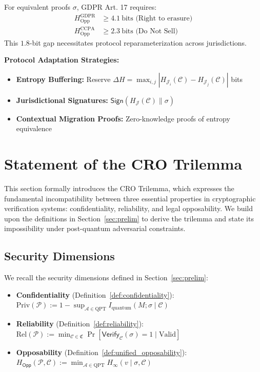 \documentclass[preprint,12pt]{elsarticle}
\begin{document}
            \begin{example}
                For equivalent proofs $\sigma$, GDPR Art. 17 requires:
                \begin{align*}
                    H_{\text{Opp}}^{\text{GDPR}} &\geq 4.1\ \text{bits (Right to erasure)} \\
                    H_{\text{Opp}}^{\text{CCPA}} &\geq 2.3\ \text{bits (Do Not Sell)}
                \end{align*}
                This $1.8$-bit gap necessitates protocol reparameterization across jurisdictions.
            \end{example}

            \textbf{Protocol Adaptation Strategies:}
            \begin{itemize}
                \item \textbf{Entropy Buffering:} Reserve $\Delta H = \max_{i,j} |H_{\mathcal{J}_i}(\mathcal{C}) - H_{\mathcal{J}_j}(\mathcal{C})|$ bits
                \item \textbf{Jurisdictional Signatures:} $\mathsf{Sign}(H_{\mathcal{J}}(\mathcal{C}) \parallel \sigma)$
                \item \textbf{Contextual Migration Proofs:} Zero-knowledge proofs of entropy equivalence
            \end{itemize}


    \section{Statement of the CRO Trilemma}\label{sec:cro_trilemma}

        This section formally introduces the CRO Trilemma, which expresses the fundamental incompatibility between three essential properties in cryptographic verification systems: confidentiality, reliability, and legal opposability. We build upon the definitions in Section~\ref{sec:prelim} to derive the trilemma and state its impossibility under post-quantum adversarial constraints.
        \subsection{Security Dimensions}
            We recall the security dimensions defined in Section~\ref{sec:prelim}:
            \begin{itemize}
                \item \textbf{Confidentiality} (Definition~\ref{def:confidentiality}): 
                    $\mathrm{Priv}(\mathcal{P}) := 1 - \sup_{\mathcal{A} \in \mathrm{QPT}} I_{\text{quantum}}(M; \sigma \mid \mathcal{C})$
                \item \textbf{Reliability} (Definition~\ref{def:reliability}): 
                    $\mathrm{Rel}(\mathcal{P}) := \min_{\mathcal{C} \in \mathfrak{C}} \Pr[\mathsf{Verify}_\mathcal{C}(\sigma) = 1 \mid \text{Valid}]$
                \item \textbf{Opposability} (Definition~\ref{def:unified_opposability}): 
                    $H_{\mathsf{Opp}}(\mathcal{P}, \mathcal{C}) := \min_{\mathcal{A} \in \mathrm{QPT}} H_\infty(v \mid \sigma, \mathcal{C})$
            \end{itemize}
\end{document}

